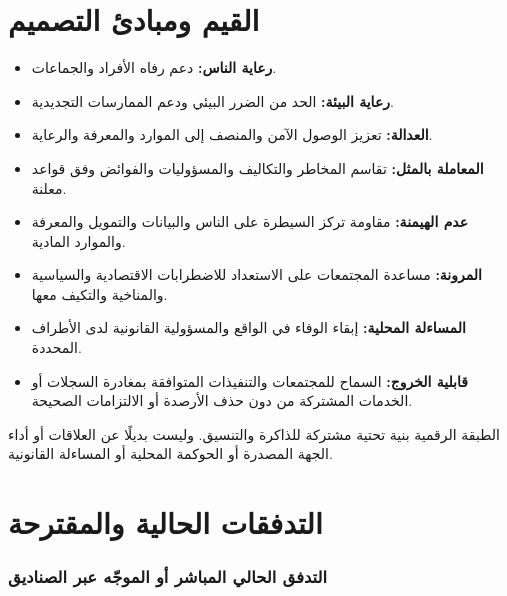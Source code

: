 \documentclass[11pt]{article}
\begin{document}
\section*{القيم ومبادئ التصميم}

\begin{itemize}[leftmargin=*]
\item \textbf{رعاية الناس:} دعم رفاه الأفراد والجماعات.
\item \textbf{رعاية البيئة:} الحد من الضرر البيئي ودعم الممارسات التجديدية.
\item \textbf{العدالة:} تعزيز الوصول الآمن والمنصف إلى الموارد والمعرفة والرعاية.
\item \textbf{المعاملة بالمثل:} تقاسم المخاطر والتكاليف والمسؤوليات والفوائض وفق قواعد معلنة.
\item \textbf{عدم الهيمنة:} مقاومة تركز السيطرة على الناس والبيانات والتمويل والمعرفة والموارد المادية.
\item \textbf{المرونة:} مساعدة المجتمعات على الاستعداد للاضطرابات الاقتصادية والسياسية والمناخية والتكيف معها.
\item \textbf{المساءلة المحلية:} إبقاء الوفاء في الواقع والمسؤولية القانونية لدى الأطراف المحددة.
\item \textbf{قابلية الخروج:} السماح للمجتمعات والتنفيذات المتوافقة بمغادرة السجلات أو الخدمات المشتركة من دون حذف الأرصدة أو الالتزامات الصحيحة.
\end{itemize}
الطبقة الرقمية بنية تحتية مشتركة للذاكرة والتنسيق. وليست بديلًا عن العلاقات أو أداء الجهة المصدرة أو الحوكمة المحلية أو المساءلة القانونية.

\section*{التدفقات الحالية والمقترحة}

\subsubsection*{التدفق الحالي المباشر أو الموجّه عبر الصناديق}
\end{document}
